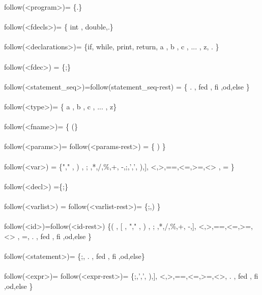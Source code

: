 \documentclass[fleqn]{article}
\begin{document}
follow(<program>)= \{.\}\\
\\
follow(<fdecls>)=  \{ int , double,.\}\\
\\
follow(<declarations>)= \{if, while, print, return, a , b , c , ... , z, .  \}\\
\\
follow(<fdec>) =   \{;\}\\
\\
follow(<statement\_seq>)=follow(statement\_seq-rest) =  \{ .  , fed , fi ,od,else \}\\
\\
follow(<type>)= \{ a , b , c , ... , z\} \\
\\
follow(<fname>)= \{ (\}\\
\\
follow(<params>)= follow(<params-rest>) = \{ ) \} \\
\\
follow(<var>) = \{"," ,  ) , ; ,*,/,\%,+, -,;,',', ),], <,>,==,<=,>=,<> , = \}\\
\\
 follow(<decl>) =\{;\}\\
 \\
follow(<varlist>) = follow(<varlist-rest>)=  \{;,) \} \\
\\
follow(<id>)=follow(<id-rest>) \{( , [ , "," , ) , ; ,*,/,\%,+, -,], <,>,==,<=,>=,<> , =, .  , fed , fi ,od,else \}\\
\\
follow(<statement>)= \{;, .  , fed , fi ,od,else\}\\
\\
follow(<expr>)= follow(<expr-rest>)= \{;,',', ),], <,>,==,<=,>=,<>, .  , fed , fi ,od,else \}\\
\\
\end{document}
